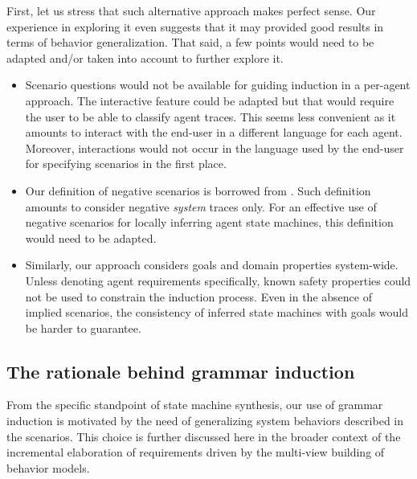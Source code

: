 First, let us stress that such alternative approach makes perfect sense. Our experience in exploring it even suggests that it may provided good results in terms of behavior generalization. That said, a few points would need to be adapted and/or taken into account to further explore it.
\begin{itemize}
\item Scenario questions would not be available for guiding induction in a per-agent approach. The interactive feature could be adapted but that would require the user to be able to classify agent traces. This seems less convenient as it amounts to interact with the end-user in a different language for each agent. Moreover, interactions would not occur in the language used by the end-user for specifying scenarios in the first place. 
\item Our definition of negative scenarios is borrowed from \cite{Uchitel:2002}. Such definition amounts to consider negative \emph{system} traces only. For an effective use of negative scenarios for locally inferring agent state machines, this definition would need to be adapted.
\item Similarly, our approach considers goals and domain properties system-wide. Unless denoting agent requirements specifically, known safety properties could not be used to constrain the induction process. Even in the absence of implied scenarios, the consistency of inferred state machines with goals would be harder to guarantee.
\end{itemize}

\subsection{The rationale behind grammar induction\label{subsection:grammar-induction-rationale}}

From the specific standpoint of state machine synthesis, our use of grammar induction is motivated by the need of generalizing system behaviors described in the scenarios. This choice is further discussed here in the broader context of the incremental elaboration of requirements driven by the multi-view building of behavior models.


